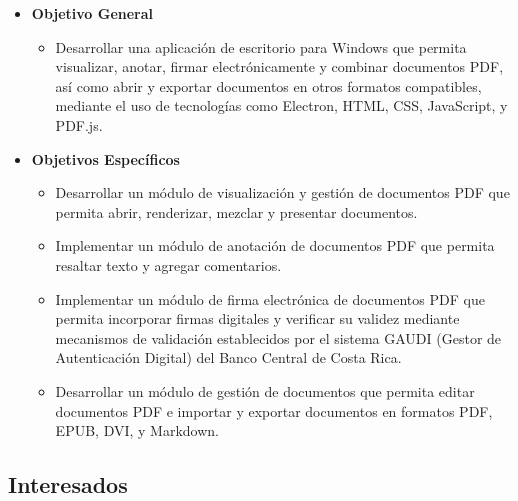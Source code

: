\begin{itemize}
    \item \textbf{Objetivo General}
    \begin{itemize}
        \item Desarrollar una aplicación de escritorio para Windows que permita visualizar, anotar, firmar electrónicamente y combinar documentos PDF, así como abrir y exportar documentos en otros formatos compatibles, mediante el uso de tecnologías como Electron, HTML, CSS, JavaScript, y PDF.js.
    \end{itemize}
    \item \textbf{Objetivos Específicos}
    \begin{itemize}
        \item Desarrollar un módulo de visualización y gestión de documentos PDF que permita abrir, renderizar, mezclar y presentar documentos.
        \item Implementar un módulo de anotación de documentos PDF que permita resaltar texto y agregar comentarios.
        \item Implementar un módulo de firma electrónica de documentos PDF que permita incorporar firmas digitales y verificar su validez mediante mecanismos de validación establecidos por el sistema GAUDI (Gestor de Autenticación Digital) del Banco Central de Costa Rica.
        \item Desarrollar un módulo de gestión de documentos que permita editar documentos PDF e importar y exportar documentos en formatos PDF, EPUB, DVI, y Markdown.
        
    \end{itemize}
\end{itemize}

\subsection{Interesados}

